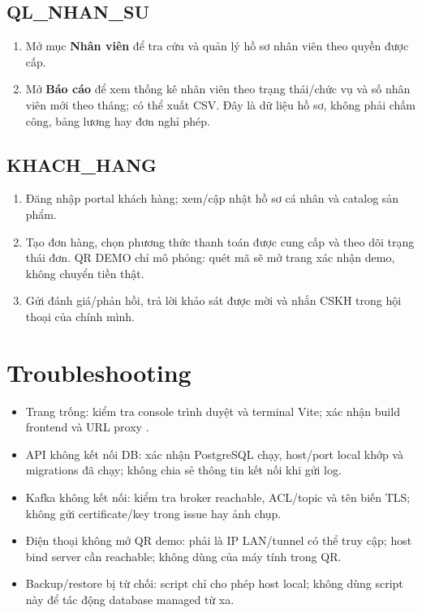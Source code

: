 \subsection*{QL\_NHAN\_SU}
\begin{enumerate}
\item Mở mục \textbf{Nhân viên} để tra cứu và quản lý hồ sơ nhân viên theo quyền được cấp.
\item Mở \textbf{Báo cáo} để xem thống kê nhân viên theo trạng thái/chức vụ và số nhân viên mới theo tháng; có thể xuất CSV. Đây là dữ liệu hồ sơ, không phải chấm công, bảng lương hay đơn nghỉ phép.
\end{enumerate}

\subsection*{KHACH\_HANG}
\begin{enumerate}
\item Đăng nhập portal khách hàng; xem/cập nhật hồ sơ cá nhân và catalog sản phẩm.
\item Tạo đơn hàng, chọn phương thức thanh toán được cung cấp và theo dõi trạng thái đơn. QR DEMO chỉ mô phỏng: quét mã sẽ mở trang xác nhận demo, không chuyển tiền thật.
\item Gửi đánh giá/phản hồi, trả lời khảo sát được mời và nhắn CSKH trong hội thoại của chính mình.
\end{enumerate}

\section{Troubleshooting}
\begin{itemize}
\item Trang trống: kiểm tra console trình duyệt và terminal Vite; xác nhận build frontend và URL proxy \texttt{}.
\item API không kết nối DB: xác nhận PostgreSQL chạy, host/port local khớp và migrations đã chạy; không chia sẻ thông tin kết nối khi gửi log.
\item Kafka không kết nối: kiểm tra broker reachable, ACL/topic và tên biến TLS; không gửi certificate/key trong issue hay ảnh chụp.
\item Điện thoại không mở QR demo: \texttt{} phải là IP LAN/tunnel có thể truy cập; host bind server cần reachable; không dùng \texttt{} của máy tính trong QR.
\item Backup/restore bị từ chối: script chỉ cho phép host local; không dùng script này để tác động database managed từ xa.
\end{itemize}
